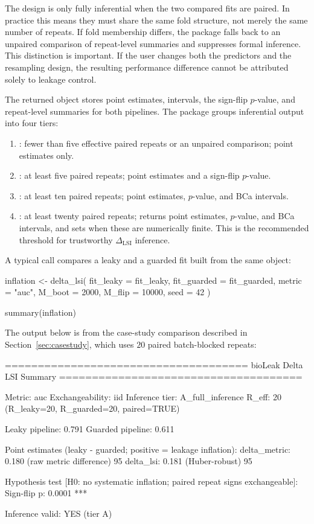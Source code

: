 \documentclass[article,shortnames]{jss}
\begin{document}
The design is only fully inferential when the two compared fits are paired. In
practice this means they must share the same fold structure, not merely the
same number of repeats. If fold membership differs, the package falls back to an
unpaired comparison of repeat-level summaries and suppresses formal inference.
This distinction is important. If the user changes both the predictors and the
resampling design, the resulting performance difference cannot be attributed solely to leakage control.

The returned  object stores point estimates, intervals,
the sign-flip $p$-value, and repeat-level summaries for both pipelines. The
package groups inferential output into four tiers:
\begin{enumerate}
\item {}: fewer than five effective paired repeats or an
unpaired comparison; point estimates only.
\item {}: at least five paired repeats; point estimates and a
sign-flip $p$-value.
\item {}: at least ten paired repeats; point estimates,
$p$-value, and BCa intervals.
\item {}: at least twenty paired repeats; returns point
estimates, $p$-value, and BCa intervals, and sets 
when these are numerically finite. This is the recommended threshold for
trustworthy $\Delta_{\mathrm{LSI}}$ inference.
\end{enumerate}

A typical call compares a leaky and a guarded fit built from the same
 object:

\begin{CodeInput}
inflation <- delta_lsi(
  fit_leaky = fit_leaky,
  fit_guarded = fit_guarded,
  metric = "auc",
  M_boot = 2000,
  M_flip = 10000,
  seed = 42
)

summary(inflation)
\end{CodeInput}

\noindent
The output below is from the case-study comparison described in
Section~\ref{sec:casestudy}, which uses $20$ paired batch-blocked repeats:

\begin{CodeOutput}
=====================================
 bioLeak Delta LSI Summary
=====================================

Metric:            auc
Exchangeability:   iid
Inference tier:    A_full_inference
R_eff:             20  (R_leaky=20, R_guarded=20, paired=TRUE)

Leaky pipeline:    0.791
Guarded pipeline:  0.611

Point estimates (leaky - guarded; positive = leakage inflation):
  delta_metric:  0.180  (raw metric difference)
  95%
  delta_lsi:     0.181  (Huber-robust)
  95%

Hypothesis test  [H0: no systematic inflation; paired repeat signs exchangeable]:
  Sign-flip p:   0.0001 ***

Inference valid:   YES (tier A)
\end{CodeOutput}
\end{document}
